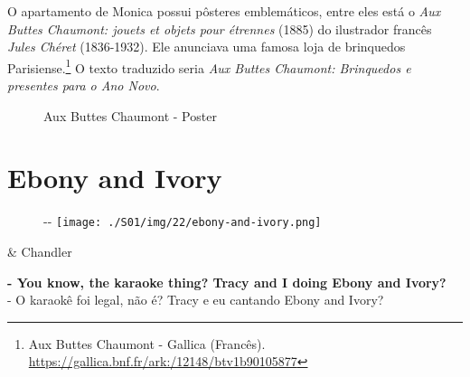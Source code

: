 O apartamento de Monica possui pôsteres emblemáticos, entre eles está o
\emph{Aux Buttes Chaumont: jouets et objets pour étrennes} (1885) do
ilustrador francês \emph{Jules Chéret} (1836-1932). Ele anunciava uma
famosa loja de brinquedos Parisiense.\footnote{\sloppy Aux Buttes Chaumont - Gallica (Francês). \url{https://gallica.bnf.fr/ark:/12148/btv1b90105877}}
O texto traduzido seria \emph{Aux Buttes Chaumont: Brinquedos e
presentes para o Ano Novo}.

\begin{figure}
  \centering
    \caption{Aux Buttes Chaumont - Poster\label{fig:aux-buttes-chaumont-poster}}
\end{figure}

\hypertarget{ebony-and-ivory}{%
\section{Ebony and Ivory}\label{ebony-and-ivory}}

\begin{figure}[!ht]
  \begin{adjustwidth}{-\oddsidemargin-1in}{-\rightmargin}
    \centering
    \texttt{[image: ./S01/img/22/ebony-and-ivory.png]}
  \end{adjustwidth}
\end{figure}

\begin{tcolorbox}[enhanced,center upper,
    drop fuzzy shadow southeast, boxrule=0.3pt,
    lower separated=false, breakable,
    colframe=black!30!dialogoBorder,colback=white]
\begin{minipage}[c]{0.16\linewidth}
   & \centering \scriptsize{Chandler}
\end{minipage}
\hfill
\begin{minipage}[c]{0.8\linewidth}
  \textbf{- You know, the karaoke thing? Tracy and I doing Ebony and Ivory?}\\
  - O karaokê foi legal, não é? Tracy e eu cantando Ebony and Ivory?
\end{minipage}
\end{tcolorbox}

